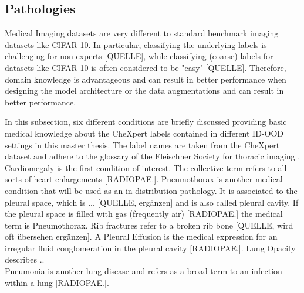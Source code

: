 \subsection{Pathologies}
Medical Imaging datasets are very different to standard benchmark imaging datasets like CIFAR-10.
In particular, classifying the underlying labels is challenging for non-experts [QUELLE], while classifying (coarse) labels for datasets like CIFAR-10 is often considered to be "easy" [QUELLE].
Therefore, domain knowledge is advantageous and can result in better performance when designing the model architecture or the data augmentations and can result in better performance.
\par
In this subsection, six different conditions are briefly discussed providing basic medical knowledge about the CheXpert labels contained in different ID-OOD settings in this master thesis.
The label names are taken from the CheXpert dataset \citep{Irvin2019} and adhere to the glossary of the Fleischner Society for thoracic imaging \citep{Hansell2008}.
\\
Cardiomegaly is the first condition of interest. The collective term refers to all sorts of heart enlargements [RADIOPAE.].
Pneumothorax is another medical condition that will be used as an in-distribution pathology.
It is associated to the pleural space, which is ... [QUELLE, ergänzen] and is also called pleural cavity.
If the pleural space is filled with gas (frequently air) [RADIOPAE.] the medical term is Pneumothorax.
Rib fractures refer to a broken rib bone [QUELLE, wird oft übersehen ergänzen].
A Pleural Effusion is the medical expression for an irregular fluid conglomeration in the pleural cavity [RADIOPAE.].
Lung Opacity describes .. \\
Pneumonia is another lung disease and refers as a broad term to an infection within a lung [RADIOPAE.]. 

